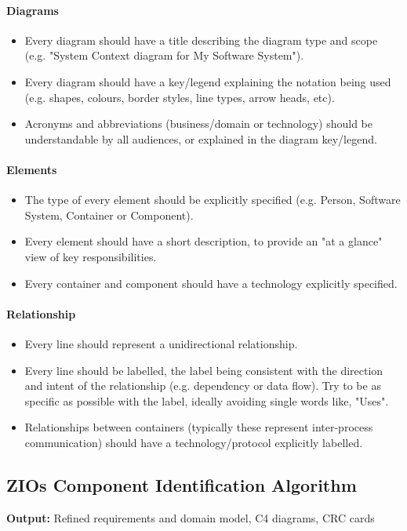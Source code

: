 \paragraph{Diagrams}
\begin{itemize}
	\item Every diagram should have a title describing the diagram type and scope (e.g. "System Context diagram for My Software System").
	\item Every diagram should have a key/legend explaining the notation being used (e.g. shapes, colours, border styles, line types, arrow heads, etc).
	\item Acronyms and abbreviations (business/domain or technology) should be understandable by all audiences, or explained in the diagram key/legend.
\end{itemize}

\paragraph{Elements}
\begin{itemize}
	\item The type of every element should be explicitly specified (e.g. Person, Software System, Container or Component).
	\item Every element should have a short description, to provide an "at a glance" view of key responsibilities.
	\item Every container and component should have a technology explicitly specified.
\end{itemize}

\paragraph{Relationship}
\begin{itemize}
	\item Every line should represent a unidirectional relationship.
	\item Every line should be labelled, the label being consistent with the direction and intent of the relationship (e.g. dependency or data flow). Try to be as specific as possible with the label, ideally avoiding single words like, "Uses".
	\item Relationships between containers (typically these represent inter-process communication) should have a technology/protocol explicitly labelled.
\end{itemize}

\subsection{ZIOs Component Identification Algorithm}
\textbf{Output:} Refined requirements and domain model, C4 diagrams, CRC cards

